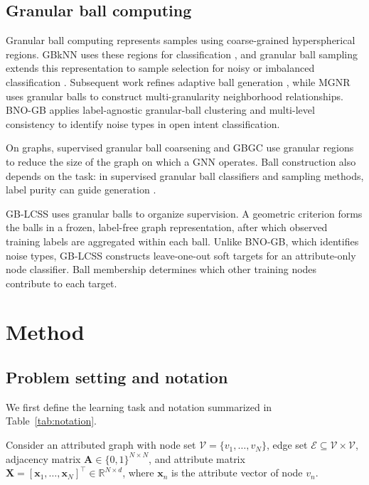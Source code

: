 \documentclass[times,review,10pt]{elsarticle}
\theoremstyle{definition}
\theoremstyle{plain}
\begin{document}
\subsection{Granular ball computing}\label{sec:2.5}

Granular ball computing represents samples using coarse-grained hyperspherical regions. GBkNN uses these regions for classification \cite{ref13}, and granular ball sampling extends this representation to sample selection for noisy or imbalanced classification \cite{ref15}. Subsequent work refines adaptive ball generation \cite{ref16}, while MGNR \cite{ref58} uses granular balls to construct multi-granularity neighborhood relationships. BNO-GB \cite{pr2026bnogb} applies label-agnostic granular-ball clustering and multi-level consistency to identify noise types in open intent classification.

On graphs, supervised granular ball coarsening \cite{ref66} and GBGC \cite{ref67} use granular regions to reduce the size of the graph on which a GNN operates. Ball construction also depends on the task: in supervised granular ball classifiers and sampling methods, label purity can guide generation \cite{ref13,ref15,ref16}.

GB-LCSS uses granular balls to organize supervision. A geometric criterion forms the balls in a frozen, label-free graph representation, after which observed training labels are aggregated within each ball. Unlike BNO-GB, which identifies noise types, GB-LCSS constructs leave-one-out soft targets for an attribute-only node classifier. Ball membership determines which other training nodes contribute to each target.
\section{Method}\label{sec:3}

\subsection{Problem setting and notation}\label{sec:3.1}

We first define the learning task and notation summarized in Table~\ref{tab:notation}.

Consider an attributed graph with node set \(\mathcal V=\{v_1,\ldots,v_N\}\), edge set \(\mathcal E\subseteq\mathcal V\times\mathcal V\), adjacency matrix \(\mathbf A\in\{0,1\}^{N\times N}\), and attribute matrix \(\mathbf X=[\mathbf x_1,\ldots,\mathbf x_N]^\top\in\mathbb R^{N\times d}\), where \(\mathbf x_n\) is the attribute vector of node \(v_n\).
\end{document}
